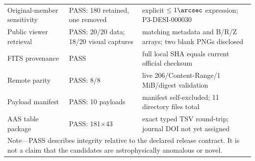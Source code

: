 \documentclass[twocolumn,linenumbers]{aastex702}
\begin{document}
\begin{center}
\begin{tabular}{p{}p{}p{}}
Original-member sensitivity & PASS: 180 retained, one removed & explicit $\le1\arcsec$ expression; P3-DESI-000030 \\
Public viewer retrieval & PASS: 20/20 data; 18/20 visual captures & matching metadata and B/R/Z arrays; two blank PNGs disclosed \\
FITS provenance & PASS & full local SHA equals current official checksum \\
Remote parity & PASS: 8/8 & live 206/Content-Range/1 MiB/digest validation \\
Payload manifest & PASS: 10 payloads & manifest self-excluded; 11 directory files total \\
AAS table package & PASS: 181$\times$43 & exact typed TSV round-trip; journal DOI not yet assigned \\
\bottomrule
\multicolumn{3}{p{0.88\textwidth}}{\footnotesize Note---PASS describes integrity relative to the
declared release contract. It is not a claim that the candidates are astrophysically anomalous
or novel.}\\
\end{tabular}
\end{center}
\end{document}
